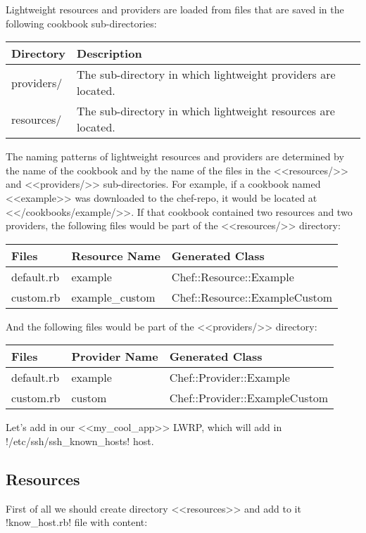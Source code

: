 Lightweight resources and providers are loaded from files that are saved in the following cookbook sub-directories:

\begin{tabular}{ | l | l | }
  \hline
  Directory	& Description \\
  \hline
  providers/ & The sub-directory in which lightweight providers are located. \\
  resources/ & The sub-directory in which lightweight resources are located. \\
  \hline
\end{tabular}

The naming patterns of lightweight resources and providers are determined by the name of the cookbook and by the name of the files in the <<resources/>> and <<providers/>> sub-directories. For example, if a cookbook named <<example>> was downloaded to the chef-repo, it would be located at <</cookbooks/example/>>. If that cookbook contained two resources and two providers, the following files would be part of the <<resources/>> directory:

\begin{tabular}{ | l | l | l | }
  \hline
  Files	& Resource Name	& Generated Class \\
  \hline
  default.rb & example & Chef::Resource::Example \\
  custom.rb	& example\_custom & Chef::Resource::ExampleCustom \\
  \hline
\end{tabular}

And the following files would be part of the <<providers/>> directory:

\begin{tabular}{ | l | l | l | }
  \hline
  Files	& Provider Name	& Generated Class \\
  \hline
  default.rb & example & Chef::Provider::Example \\
  custom.rb	& custom & Chef::Provider::ExampleCustom \\
  \hline
\end{tabular}

Let's add in our <<my\_cool\_app>> LWRP, which will add in \inline!/etc/ssh/ssh_known_hosts! host.

\subsection{Resources}

First of all we should create directory <<resources>> and add to it \inline!know_host.rb! file with content:

